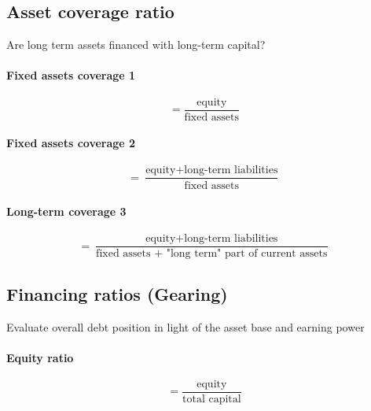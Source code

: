 \documentclass[a4paper] {scrartcl}
\begin{document}
\subsection{Asset coverage ratio}
Are long term assets financed with long-term capital?

\paragraph{Fixed assets coverage 1} %
\label{par:fixed_assets_coverage_1}
\begin{equation}
	= \frac{\text{equity}}{\text{fixed assets}}
\end{equation}

\paragraph{Fixed assets coverage 2} %
\label{par:fixed_assets_coverage_2}
\begin{equation}
	= \frac{\text{equity} + \text{long-term liabilities}}{\text{fixed assets}}
\end{equation}


\paragraph{Long-term coverage 3} %
\label{par:long_term_coverage_3}
\begin{equation}
	= \frac{\text{equity} + \text{long-term liabilities}}{\text{fixed assets + "long term" part of current assets}}
\end{equation}


\subsection{Financing ratios (Gearing)} %
\label{sub:financing_ratios_gearing_}
Evaluate overall debt position in light of the asset base and earning power


\paragraph{Equity ratio} %
\label{par:equity_ratio}
\begin{equation}
	= \frac{\text{equity}}{\text{total capital}}
\end{equation}
\end{document}
